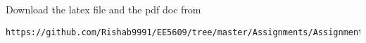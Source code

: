 \documentclass[journal,12pt,twocolumn]{IEEEtran}
\begin{document}
% 
\maketitle
\renewcommand{\theequation}{\arabic{equation}}
%
%
Download the latex file and the pdf doc from
\begin{lstlisting}
https://github.com/Rishab9991/EE5609/tree/master/Assignments/Assignment8
\end{lstlisting}
\end{document}
